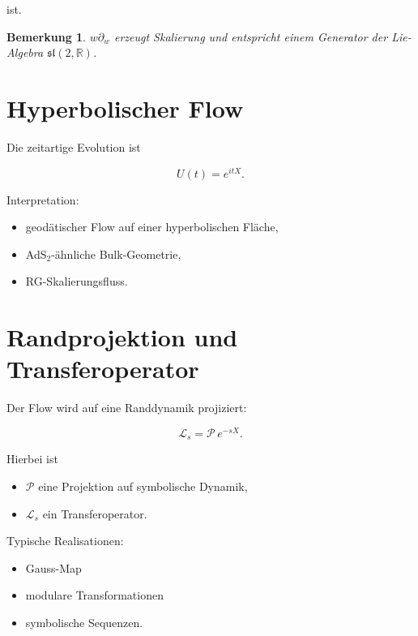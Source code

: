 \documentclass[a4paper,11pt]{article}
\newtheorem{remark}[definition]{Bemerkung}
\begin{document}
	ist.
	
	\begin{remark}
		$w\partial_w$ erzeugt Skalierung und entspricht einem Generator
		der Lie-Algebra $\mathfrak{sl}(2,\mathbb{R})$.
	\end{remark}
	
	\section{Hyperbolischer Flow}
	
	Die zeitartige Evolution ist
	
	\[
	U(t) = e^{itX}.
	\]
	
	Interpretation:
	
	\begin{itemize}
		\item geodätischer Flow auf einer hyperbolischen Fläche,
		\item AdS$_2$-ähnliche Bulk-Geometrie,
		\item RG-Skalierungsfluss.
	\end{itemize}
	
	\section{Randprojektion und Transferoperator}
	
	Der Flow wird auf eine Randdynamik projiziert:
	
	\[
	\mathcal{L}_s = \mathcal{P}\, e^{-sX}.
	\]
	
	Hierbei ist
	
	\begin{itemize}
		\item $\mathcal{P}$ eine Projektion auf symbolische Dynamik,
		\item $\mathcal{L}_s$ ein Transferoperator.
	\end{itemize}
	
	Typische Realisationen:
	
	\begin{itemize}
		\item Gauss-Map
		\item modulare Transformationen
		\item symbolische Sequenzen.
	\end{itemize}
	
\end{document}
